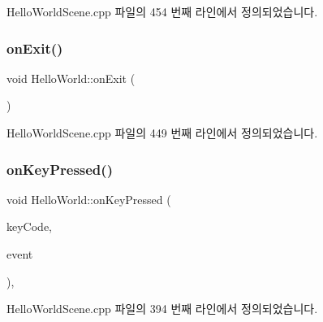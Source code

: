 Hello\+World\+Scene.\+cpp 파일의 454 번째 라인에서 정의되었습니다.

\mbox{\label{class_hello_world_a348da8e1c3061248666676878e692572}} 
\subsubsection{\texorpdfstring{on\+Exit()}{onExit()}}
{\footnotesize\ttfamily void Hello\+World\+::on\+Exit (\begin{DoxyParamCaption}{ }\end{DoxyParamCaption})\hspace{0.3cm}{\ttfamily [virtual]}}



Hello\+World\+Scene.\+cpp 파일의 449 번째 라인에서 정의되었습니다.

\mbox{\label{class_hello_world_af2d5a509259a5d0fce7770a38df371d3}} 
\subsubsection{\texorpdfstring{on\+Key\+Pressed()}{onKeyPressed()}}
{\footnotesize\ttfamily void Hello\+World\+::on\+Key\+Pressed (\begin{DoxyParamCaption}\item[{\hyperlink{_hello_world_scene_8cpp_a29d93764040e709187aa17656a43405d}{cocos2d\+::\+Event\+Keyboard\+::\+Key\+Code}}]{key\+Code,  }\item[{cocos2d\+::\+Event $\ast$}]{event }\end{DoxyParamCaption})\hspace{0.3cm}{\ttfamily [protected]}, {\ttfamily [virtual]}}



Hello\+World\+Scene.\+cpp 파일의 394 번째 라인에서 정의되었습니다.

\mbox{\label{class_hello_world_acb7b8934f4697e752182a650a1dc7c3a}} 

